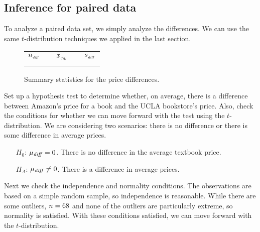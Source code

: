 \D{\newpage}

\subsection{Inference for paired data}

To analyze a paired data set,
we simply analyze the differences.
We can use the same $t$-distribution techniques
we applied in the last section.

\begin{figure}[h]
\centering
\begin{tabular}{ccccc}
\hline
$n_{_{\text{\emph{diff}}}}$	&\hspace{3mm}& $\bar{x}_{_{\text{\emph{diff}}}}$	&\hspace{3mm}& $s_{_{\text{\emph{diff}}}}$ \vspace{1mm}\\
\uclabookN{}  && \uclabookM{}  && \uclabookSD{} \\
\hline
\end{tabular}
\caption{Summary statistics for the \uclabookN{} price differences.}
\label{textbooksSummaryStats}
\end{figure}


\begin{examplewrap}
\begin{nexample}{Set up a hypothesis test
    to determine whether, on average, there is a difference
    between Amazon's price for a book and the UCLA
    bookstore's price.
    Also, check the conditions for whether we can move
    forward with the test using the $t$-distribution.}
  \label{htSetupTextbookPriceDiff}%
  We are considering two scenarios: there is no difference
  or there is some difference in average prices.
  \begin{itemize}
  \setlength{\itemsep}{0mm}
  \item[$H_0$:]
      $\mu_{\text{\emph{diff}}} = 0$.
      There is no difference in the average textbook price.
  \item[$H_A$:]
      $\mu_{\text{\emph{diff}}} \neq 0$.
      There is a difference in average prices.
  \end{itemize}

  Next we check the independence and normality conditions.
  The observations are based on a simple random sample,
  so independence is reasonable.
  While there are some outliers,
  $n = 68{}$ and none of the outliers
  are particularly extreme, so normality is satisfied.
  With these conditions satisfied,
  we can move forward with the $t$-distribution.
\end{nexample}
\end{examplewrap}

